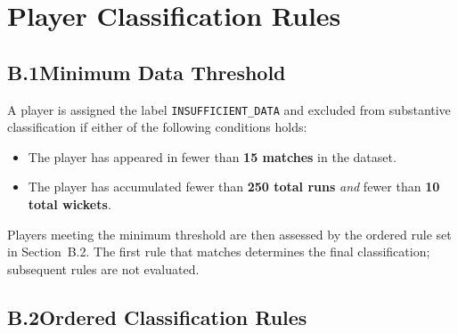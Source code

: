 \chapter{Player Classification Rules}
\label{app:player_classification}

\section*{B.1\quad Minimum Data Threshold}

A player is assigned the label \texttt{INSUFFICIENT\_DATA} and excluded from substantive classification if either of the following conditions holds:

\begin{itemize}
    \item The player has appeared in fewer than \textbf{15 matches} in the dataset.
    \item The player has accumulated fewer than \textbf{250 total runs} \textit{and} fewer than \textbf{10 total wickets}.
\end{itemize}

Players meeting the minimum threshold are then assessed by the ordered rule set in Section~B.2. The first rule that matches determines the final classification; subsequent rules are not evaluated.

\section*{B.2\quad Ordered Classification Rules}


